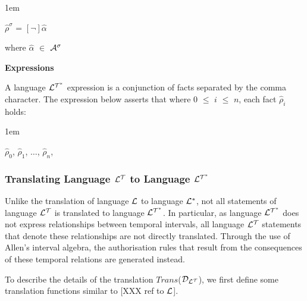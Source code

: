 \documentclass[11pt]{report}
\newenvironment{vquote}
{
  \begin{list}{}{\leftmargin 1em}\item[]
}
{
  \end{list}
}
\begin{document}
\begin{itemize}
              \begin{vquote}
                $\hat{\rho}^{\sigma}$ =
                  $[\lnot]$$\hat{\alpha}$

                where
                $\hat{\alpha}$ $\in$ ${\cal A}^{\sigma}$
              \end{vquote}

            \item
              {\bf Expressions}

              A language ${\cal L^{T^*}}$ expression is a conjunction of
              facts separated by the comma character. The expression below
              asserts that where $0$ $\leq$ $i$ $\leq$ $n$, each fact
              $\hat{\rho}_i$ holds:

              \begin{vquote}
                $\hat{\rho}_0$, 
                $\hat{\rho}_1$, 
                $\ldots$,
                $\hat{\rho}_n$, 
              \end{vquote}

          \end{itemize}

        \subsubsection{Translating Language ${\cal L^T}$ to Language ${\cal L^{T^*}}$}

          Unlike the translation of language ${\cal L}$ to language
          ${\cal L^*}$, not all statements of language ${\cal L^T}$ is
          translated to language ${\cal L^{T^*}}$. In particular, as language
          ${\cal L^{T^*}}$ does not express relationships between temporal
          intervals, all language ${\cal L^T}$ statements that denote these
          relationships are not directly translated. Through the use of Allen's
          interval algebra, the authorisation rules that result from the
          consequences of these temporal relations are generated instead.

          To describe the details of the translation $Trans$(${\cal D_{L^T}}$),
          we first define some translation functions similar to
          [XXX ref to ${\cal L}$].
\end{document}
